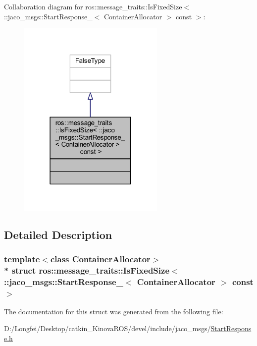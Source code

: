 Collaboration diagram for ros\+:\+:message\+\_\+traits\+:\+:Is\+Fixed\+Size$<$ \+:\+:jaco\+\_\+msgs\+:\+:Start\+Response\+\_\+$<$ Container\+Allocator $>$ const $>$\+:
\nopagebreak
\begin{figure}[H]
\begin{center}
\leavevmode
\includegraphics[width=202pt]{d2/db0/structros_1_1message__traits_1_1IsFixedSize_3_01_1_1jaco__msgs_1_1StartResponse___3_01ContainerA680dc0174f951691f3d8298e97f5be08}
\end{center}
\end{figure}


\subsection{Detailed Description}
\subsubsection*{template$<$class Container\+Allocator$>$\\*
struct ros\+::message\+\_\+traits\+::\+Is\+Fixed\+Size$<$ \+::jaco\+\_\+msgs\+::\+Start\+Response\+\_\+$<$ Container\+Allocator $>$ const  $>$}



The documentation for this struct was generated from the following file\+:\begin{DoxyCompactItemize}
\item 
D\+:/\+Longfei/\+Desktop/catkin\+\_\+\+Kinova\+R\+O\+S/devel/include/jaco\+\_\+msgs/\hyperlink{StartResponse_8h}{Start\+Response.\+h}\end{DoxyCompactItemize}
